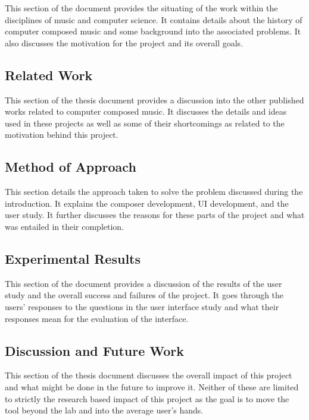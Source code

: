 This section of the document provides the situating of the work within the disciplines of music and computer science.  It contains details about the history of computer composed music and some background into the associated problems.  It also discusses the motivation for the project and its overall goals.

\subsection{Related Work}
\label{subsec:outlinerelated}

This section of the thesis document provides a discussion into the other published works related to computer composed music.  It discusses the details and ideas used in these projects as well as some of their shortcomings as related to the motivation behind this project.

\subsection{Method of Approach}
\label{subsec:outlinemethod}

This section details the approach taken to solve the problem discussed during the introduction.  It explains the composer development, UI development, and the user study.  It further discusses the reasons for these parts of the project and what was entailed in their completion.

\subsection{Experimental Results}
\label{subsec:outlineresults}

This section of the document provides a discussion of the results of the user study and the overall success and failures of the project.  It goes through the users' responses to the questions in the user interface study and what their responses mean for the evaluation of the interface.

\subsection{Discussion and Future Work}
\label{subsec:outlinediscusion}

This section of the thesis document discusses the overall impact of this project and what might be done in the future to improve it.  Neither of these are limited to strictly the research based impact of this project as the goal is to move the tool beyond the lab and into the average user's hands.
